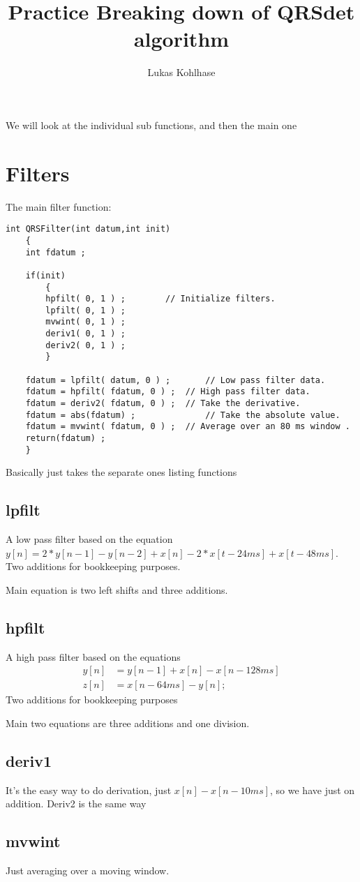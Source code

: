 \documentclass{article}
\title{Practice Breaking down of QRSdet algorithm}
\author{Lukas Kohlhase}
\begin{document}
\maketitle
We will look at the individual sub functions, and then the main one 
\section{Filters}
The main filter function: 
\begin{lstlisting}
int QRSFilter(int datum,int init)
	{
	int fdatum ;

	if(init)
		{
		hpfilt( 0, 1 ) ;		// Initialize filters.
		lpfilt( 0, 1 ) ;
		mvwint( 0, 1 ) ;
		deriv1( 0, 1 ) ;
		deriv2( 0, 1 ) ;
		}

	fdatum = lpfilt( datum, 0 ) ;		// Low pass filter data.
	fdatum = hpfilt( fdatum, 0 ) ;	// High pass filter data.
	fdatum = deriv2( fdatum, 0 ) ;	// Take the derivative.
	fdatum = abs(fdatum) ;				// Take the absolute value.
	fdatum = mvwint( fdatum, 0 ) ;	// Average over an 80 ms window .
	return(fdatum) ;
	}
\end{lstlisting}
Basically just takes the separate ones listing functions
\subsection{lpfilt}
A low pass filter based on the equation $y[n] = 2*y[n-1] - y[n-2] + x[n] - 2*x[t-24 ms] + x[t-48 ms]$. \\ 
Two additions for bookkeeping purposes. 

Main equation is two left shifts and three additions.
\subsection{hpfilt}
A high pass filter based on the equations
\begin{align*}
	y[n] &= y[n-1] + x[n] - x[n-128 ms] \\
  z[n] &= x[n-64 ms] - y[n] ;
\end{align*}
Two additions for bookkeeping purposes 

Main two equations are three additions and one division.

\subsection{deriv1}
It's the easy way to do derivation, just $x[n]-x[n-10ms]$, so we have just on addition. Deriv2 is the same way
\subsection{mvwint}
Just averaging over a moving window. 
\end{document}
